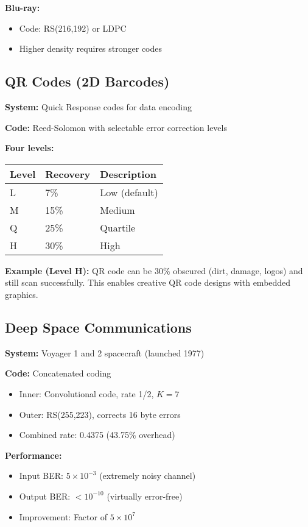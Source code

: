 \textbf{Blu-ray:}
\begin{itemize}
\item Code: RS(216,192) or LDPC
\item Higher density requires stronger codes
\end{itemize}

\subsection{QR Codes (2D Barcodes)}

\textbf{System:} Quick Response codes for data encoding

\textbf{Code:} Reed-Solomon with selectable error correction levels

\textbf{Four levels:}
\begin{center}
\begin{tabular}{@{}lll@{}}
\toprule
Level & Recovery & Description \\
\midrule
L & 7\% & Low (default) \\
M & 15\% & Medium \\
Q & 25\% & Quartile \\
H & 30\% & High \\
\bottomrule
\end{tabular}
\end{center}

\textbf{Example (Level H):} QR code can be 30\% obscured (dirt, damage, logos) and still scan successfully. This enables creative QR code designs with embedded graphics.

\subsection{Deep Space Communications}

\textbf{System:} Voyager 1 and 2 spacecraft (launched 1977)

\textbf{Code:} Concatenated coding
\begin{itemize}
\item Inner: Convolutional code, rate 1/2, $K=7$
\item Outer: RS(255,223), corrects 16 byte errors
\item Combined rate: 0.4375 (43.75\% overhead)
\end{itemize}

\textbf{Performance:}
\begin{itemize}
\item Input BER: $5 \times 10^{-3}$ (extremely noisy channel)
\item Output BER: $< 10^{-10}$ (virtually error-free)
\item Improvement: Factor of $5 \times 10^{7}$
\end{itemize}

